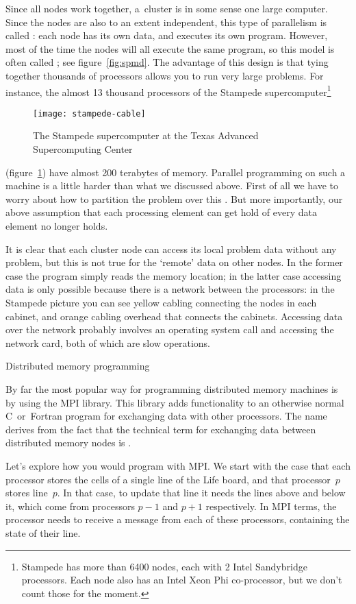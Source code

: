 Since all nodes work together, a~cluster is in some sense one
large computer. 
Since the nodes are also to an extent independent, this type of parallelism is
called : each node has its own data, and executes its own program.
However, most of the time the nodes will all execute
the same program, so this model is often called ; see figure~\ref{fig:spmd}.
The advantage of this design is that tying
together thousands of processors allows you to run very large problems.
For instance, the almost 13 thousand processors of the Stampede supercomputer\footnote
{Stampede has more than 6400 nodes, each with 2 Intel Sandybridge processors.
Each node also has an Intel Xeon Phi co-processor, but we don't count those for the moment.}
\begin{figure}[t]
  \texttt{[image: stampede-cable]}
  \caption{The Stampede supercomputer at the Texas Advanced Supercomputing Center}
  \label{fig:stampede}
\end{figure}
(figure~\ref{fig:stampede}) have almost 200 terabytes of memory.
Parallel programming on such a machine is a little harder
than what we discussed above.
First of all we have to worry about
how to partition the problem over this .
But more importantly, our above assumption that each processing element
can get hold of every data element no longer holds.

It is clear that each cluster node can access its local
problem data without any problem, but this is not true for the `remote' data
on other nodes.
In the former case the program simply reads the memory location;
in the latter case accessing data is only possible because there is a network
between the processors: in the Stampede picture you can see yellow cabling
connecting the nodes in each cabinet, and orange cabling overhead that connects the cabinets.
Accessing data over the network
probably involves an operating system call and accessing
the network card, both of which are slow operations.

 {Distributed memory programming}
\label{sec:mpi}

By far the most popular way for programming distributed memory
machines is by using the \acf{MPI} library. This library adds
functionality to an otherwise normal C~or~Fortran program for
exchanging data with other processors. The name derives
from the fact that the technical term for
exchanging data between distributed memory nodes
is .

Let's explore how you would program with MPI.
We start with the case that each processor stores the cells
of a single line of the Life board, and that processor~$p$ stores line~$p$.
In that case, to update that line
it needs the lines above and below it, which come from processors $p-1$ and $p+1$
respectively. In MPI terms, the processor needs to receive a message
from each of these processors, containing the state of their line.

